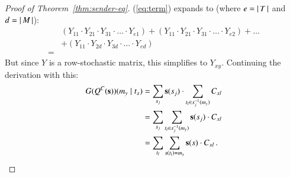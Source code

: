 \begin{proof}[Proof of Theorem~\ref{thm:sender-eq}]
  (\ref{eq:term}) expands to (where $e = \left \lvert \, T \, \right\rvert$ and $d=\left \lvert \, M \, \right\rvert$):
  \begin{align*}
    & (Y_{11} \cdot Y_{21} \cdot Y_{31} \cdot \ldots \cdot Y_{e1}) +
    (Y_{11} \cdot Y_{21} \cdot Y_{31} \cdot \ldots \cdot Y_{e2}) + 
    \dots \\
    & + (Y_{11} \cdot Y_{2d} \cdot
    Y_{3d} \cdot \ldots \cdot
    Y_{ed})\\
    = &    
  \end{align*}
  But since $Y$ is a row-stochastic matrix, this simplifies to
  $Y_{xy}$. Continuing the derivation with this:
  \begin{align*}
    G(Q^C(\mathrm{\mathbf{s}}))(m_y \mid t_x) 
    & = \sum_{s_j} \mathrm{\mathbf{s}}(s_j) \cdot
    \sum_{t_l \in s_j^{-1}(m_y)} C_{xl} \\
    & = \sum_{s_j} \sum_{t_l \in s_j^{-1}(m_y)} \mathrm{\mathbf{s}}(s_j) \cdot
     C_{xl} \\
     & = \sum_{t_l}
    \sum_{s(t_l) = m_y} \mathrm{\mathbf{s}}(s) \cdot C_{xl}\,.
  \end{align*}

\end{proof}


